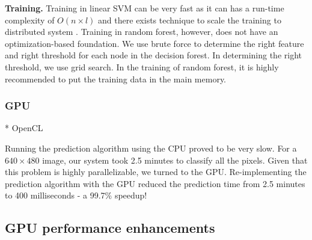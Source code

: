 \textbf{Training.} Training in linear SVM can be very fast as it can has a run-time complexity of $O(n\times l)$ and there exists technique to scale the training to distributed system . Training in random forest, however, does not have an optimization-based foundation. We use brute force to determine the right feature and right threshold for each node in the decision forest. In determining the right threshold, we use grid search. In the training of random forest, it is highly recommended to put the training data in the main memory. 


\subsubsection{GPU} 
* OpenCL

Running the prediction algorithm using the CPU proved to be very slow. For a $640\times480$ image, our system took 2.5 minutes to classify all the pixels. Given that this problem is highly parallelizable, we turned to the GPU. Re-implementing the prediction algorithm with the GPU reduced the prediction time from 2.5 minutes to 400 milliseconds - a 99.7\% speedup!


\subsection{GPU performance enhancements}